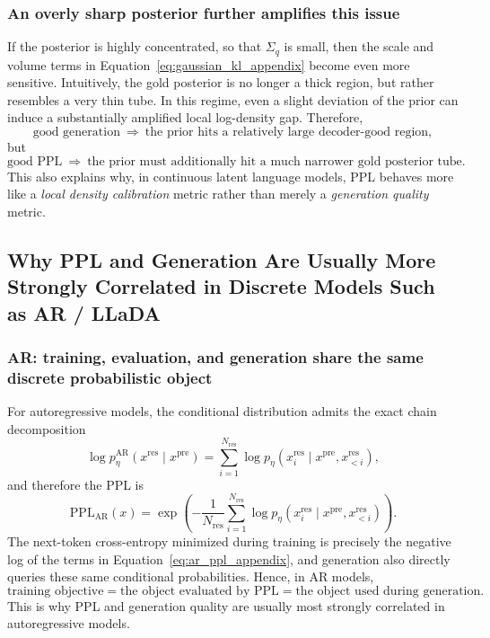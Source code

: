 \subsubsection{An overly sharp posterior further amplifies this issue}

If the posterior is highly concentrated, so that $\Sigma_q$ is small, then the scale and volume terms in Equation~\eqref{eq:gaussian_kl_appendix} become even more sensitive. Intuitively, the gold posterior is no longer a thick region, but rather resembles a very thin tube. In this regime, even a slight deviation of the prior can induce a substantially amplified local log-density gap. Therefore,
\begin{equation}
\text{good generation} \ \Longrightarrow\ \text{the prior hits a relatively large decoder-good region},
\end{equation}
but
\begin{equation}
\text{good PPL} \ \Longrightarrow\ \text{the prior must additionally hit a much narrower gold posterior tube}.
\end{equation}
This also explains why, in continuous latent language models, PPL behaves more like a \emph{local density calibration} metric rather than merely a \emph{generation quality} metric.

\subsection{Why PPL and Generation Are Usually More Strongly Correlated in Discrete Models Such as AR / LLaDA}

\subsubsection{AR: training, evaluation, and generation share the same discrete probabilistic object}

For autoregressive models, the conditional distribution admits the exact chain decomposition
\begin{equation}
\log p_{\eta}^{\mathrm{AR}}(x^{\mathrm{res}}\mid x^{\mathrm{pre}})
=
\sum_{i=1}^{N_{\mathrm{res}}}
\log p_{\eta}(x_i^{\mathrm{res}}\mid x^{\mathrm{pre}},x_{<i}^{\mathrm{res}}),
\label{eq:ar_factorization_appendix}
\end{equation}
and therefore the PPL is
\begin{equation}
\mathrm{PPL}_{\mathrm{AR}}(x)
=
\exp\!\left(
-\frac{1}{N_{\mathrm{res}}}
\sum_{i=1}^{N_{\mathrm{res}}}
\log p_{\eta}(x_i^{\mathrm{res}}\mid x^{\mathrm{pre}},x_{<i}^{\mathrm{res}})
\right).
\label{eq:ar_ppl_appendix}
\end{equation}
The next-token cross-entropy minimized during training is precisely the negative log of the terms in Equation~\eqref{eq:ar_ppl_appendix}, and generation also directly queries these same conditional probabilities. Hence, in AR models,
\begin{equation}
\text{training objective}
=
\text{the object evaluated by PPL}
=
\text{the object used during generation}.
\label{eq:ar_alignment_appendix}
\end{equation}
This is why PPL and generation quality are usually most strongly correlated in autoregressive models.

